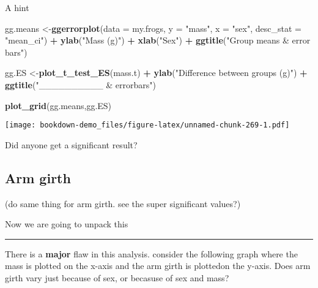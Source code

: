 \documentclass[]{book}
\newenvironment{Shaded}{\begin{snugshade}}{\end{snugshade}}
\newcommand{\KeywordTok}[1]{\textcolor[rgb]{0.13,0.29,0.53}{\textbf{#1}}}
\newcommand{\DataTypeTok}[1]{\textcolor[rgb]{0.13,0.29,0.53}{#1}}
\newcommand{\StringTok}[1]{\textcolor[rgb]{0.31,0.60,0.02}{#1}}
\newcommand{\OperatorTok}[1]{\textcolor[rgb]{0.81,0.36,0.00}{\textbf{#1}}}
\newcommand{\NormalTok}[1]{#1}
\theoremstyle{definition}
\theoremstyle{definition}
\theoremstyle{definition}
\theoremstyle{remark}
\begin{document}
A hint

\begin{Shaded}
\begin{Highlighting}[]
\NormalTok{gg.means <-}\KeywordTok{ggerrorplot}\NormalTok{(}\DataTypeTok{data =}\NormalTok{ my.frogs,}
          \DataTypeTok{y =} \StringTok{"mass"}\NormalTok{,}
          \DataTypeTok{x =} \StringTok{"sex"}\NormalTok{,}
          \DataTypeTok{desc_stat =} \StringTok{"mean_ci"}\NormalTok{) }\OperatorTok{+}
\StringTok{  }\KeywordTok{ylab}\NormalTok{(}\StringTok{"Mass (g)"}\NormalTok{) }\OperatorTok{+}
\StringTok{  }\KeywordTok{xlab}\NormalTok{(}\StringTok{"Sex"}\NormalTok{) }\OperatorTok{+}
\StringTok{  }\KeywordTok{ggtitle}\NormalTok{(}\StringTok{"Group means & error bars"}\NormalTok{)}


\NormalTok{gg.ES <-}\KeywordTok{plot_t_test_ES}\NormalTok{(mass.t) }\OperatorTok{+}
\StringTok{  }\KeywordTok{ylab}\NormalTok{(}\StringTok{"Difference between groups (g)"}\NormalTok{) }\OperatorTok{+}
\StringTok{  }\KeywordTok{ggtitle}\NormalTok{(}\StringTok{"__________ & errorbars"}\NormalTok{)}
\end{Highlighting}
\end{Shaded}

\begin{Shaded}
\begin{Highlighting}[]
\KeywordTok{plot_grid}\NormalTok{(gg.means,gg.ES)}
\end{Highlighting}
\end{Shaded}

\texttt{[image: bookdown-demo\_files/figure-latex/unnamed-chunk-269-1.pdf]}

Did anyone get a significant result?

\subsection{Arm girth}\label{arm-girth}

(do same thing for arm girth. see the super significant values?)

Now we are going to unpack this

\begin{center}\rule{0.5\linewidth}{\linethickness}\end{center}

There is a \textbf{major} flaw in this analysis. consider the following
graph where the mass is plotted on the x-axis and the arm girth is
plottedon the y-axis. Does arm girth vary just because of sex, or
becasuse of sex and mass?
\end{document}
